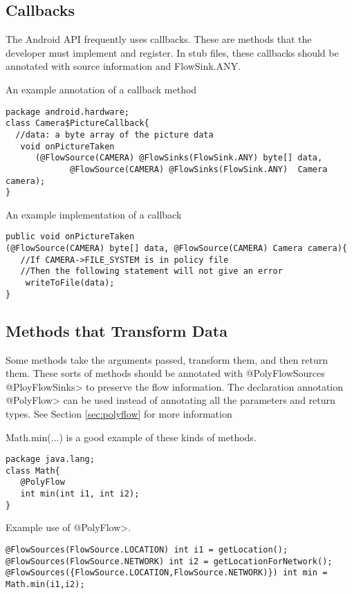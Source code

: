\subsection{Callbacks}
The Android API frequently uses callbacks.  These are methods that the developer must 
implement and register. In stub files, these callbacks should be annotated
with source information and FlowSink.ANY.  

An example annotation of a callback method
\begin{Verbatim}
package android.hardware;
class Camera$PictureCallback{
  //data: a byte array of the picture data
   void onPictureTaken 
      (@FlowSource(CAMERA) @FlowSinks(FlowSink.ANY) byte[] data, 
             @FlowSource(CAMERA) @FlowSinks(FlowSink.ANY)  Camera camera);
}
\end{Verbatim}

An example implementation of a callback
\begin{Verbatim}
public void onPictureTaken
(@FlowSource(CAMERA) byte[] data, @FlowSource(CAMERA) Camera camera){
   //If CAMERA->FILE_SYSTEM is in policy file
   //Then the following statement will not give an error
    writeToFile(data);
}
\end{Verbatim}


\subsection{Methods that Transform Data}

Some methods take the arguments passed, transform them, and then return them.  These sorts of 
methods should be annotated with \<@PolyFlowSources @PloyFlowSinks>
  to preserve the flow information.  The declaration annotation \<@PolyFlow> can be used instead of
  annotating all the parameters and return types. See Section \ref{sec:polyflow} for more information 
  
  Math.min(...) is a good example of these kinds of methods. 
  
  \begin{Verbatim}
package java.lang;
class Math{
   @PolyFlow  
   int min(int i1, int i2);
}
\end{Verbatim}

Example use of \<@PolyFlow>.
\begin{Verbatim}
@FlowSources(FlowSource.LOCATION) int i1 = getLocation();
@FlowSources(FlowSource.NETWORK) int i2 = getLocationForNetwork();
@FlowSources({FlowSource.LOCATION,FlowSource.NETWORK)}) int min = Math.min(i1,i2);
 \end{Verbatim}

